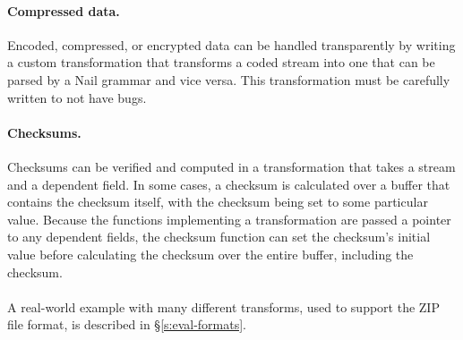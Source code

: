 \paragraph{Compressed data.}
Encoded, compressed, or encrypted data can be handled transparently by writing a custom
transformation that transforms a coded stream into one that can be parsed by a Nail grammar and vice
versa. This transformation must be carefully written to not have bugs.

\paragraph{Checksums.}
Checksums can be verified and computed in a transformation that takes a stream and a dependent
field. In some cases, a checksum is calculated over a buffer that contains the checksum itself, with
the checksum being set to some particular value. Because the functions implementing a transformation
are passed a pointer to any dependent fields, the checksum function can set the checksum's initial
value before calculating the checksum over the entire buffer, including the checksum.


\paragraph{}
A real-world example with many different transforms, used to support
the ZIP file format, is described in \S\ref{s:eval-formats}.







